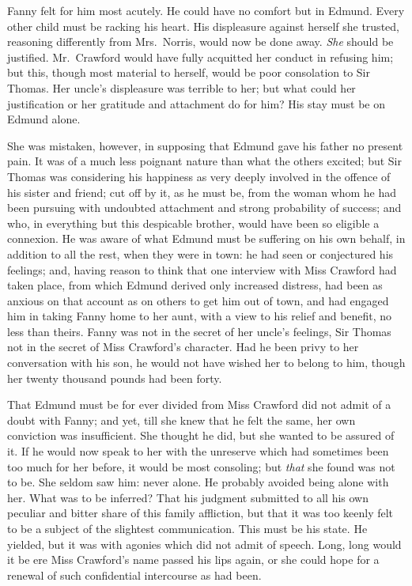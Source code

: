 Fanny felt for him most acutely.  He could have no comfort
but in Edmund.  Every other child must be racking his heart.
His displeasure against herself she trusted, reasoning
differently from Mrs.\ Norris, would now be done away.
\emph{She} should be justified.  Mr.\ Crawford would have
fully acquitted her conduct in refusing him; but this,
though most material to herself, would be poor consolation
to Sir Thomas.  Her uncle's displeasure was terrible to her;
but what could her justification or her gratitude and
attachment do for him?  His stay must be on Edmund alone.

She was mistaken, however, in supposing that Edmund gave
his father no present pain.  It was of a much less poignant
nature than what the others excited; but Sir Thomas
was considering his happiness as very deeply involved
in the offence of his sister and friend; cut off by it,
as he must be, from the woman whom he had been pursuing
with undoubted attachment and strong probability of success;
and who, in everything but this despicable brother,
would have been so eligible a connexion.  He was aware
of what Edmund must be suffering on his own behalf,
in addition to all the rest, when they were in town:
he had seen or conjectured his feelings; and, having reason
to think that one interview with Miss Crawford had taken place,
from which Edmund derived only increased distress, had been
as anxious on that account as on others to get him out of town,
and had engaged him in taking Fanny home to her aunt,
with a view to his relief and benefit, no less than theirs.
Fanny was not in the secret of her uncle's feelings,
Sir Thomas not in the secret of Miss Crawford's character.
Had he been privy to her conversation with his son, he would
not have wished her to belong to him, though her twenty
thousand pounds had been forty.

That Edmund must be for ever divided from Miss Crawford did
not admit of a doubt with Fanny; and yet, till she knew
that he felt the same, her own conviction was insufficient.
She thought he did, but she wanted to be assured of it.
If he would now speak to her with the unreserve which
had sometimes been too much for her before, it would
be most consoling; but \emph{that} she found was not to be.
She seldom saw him:  never alone.  He probably avoided
being alone with her.  What was to be inferred?  That his
judgment submitted to all his own peculiar and bitter share
of this family affliction, but that it was too keenly
felt to be a subject of the slightest communication.
This must be his state.  He yielded, but it was with
agonies which did not admit of speech.  Long, long would
it be ere Miss Crawford's name passed his lips again,
or she could hope for a renewal of such confidential
intercourse as had been.

